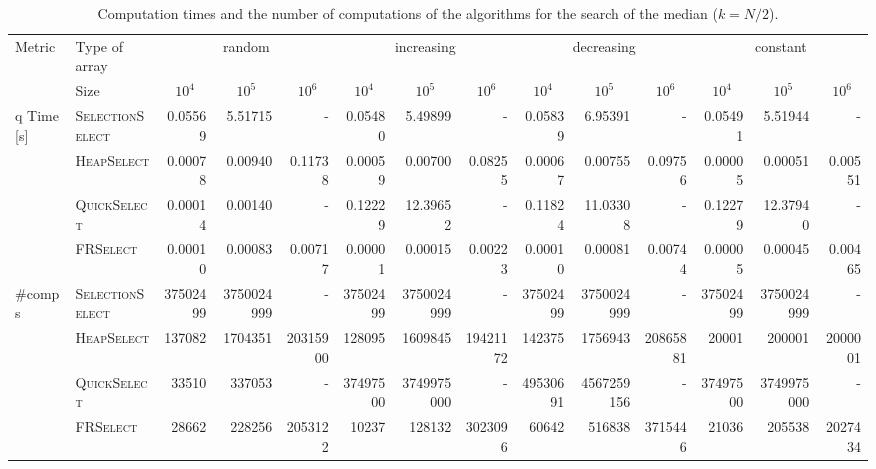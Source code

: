 \documentclass[acmconf,nonacm=true]{acmart}
\begin{document}
\begin{table}[h!]
    \centering
    \scriptsize
    \caption{Computation times and the number of computations of the algorithms for the search of the median ($k=N/2$).}
    \label{table:k-0.5N}
    \begin{tabular}{llrrrrrrrrrrrr}
        \toprule
        {Metric} & {Type of array} & \multicolumn{3}{c}{{random}} & \multicolumn{3}{c}{{increasing}} & \multicolumn{3}{c}{{decreasing}} & \multicolumn{3}{c}{{constant}} \\
        \cmidrule(r){3-5} \cmidrule(lr){6-8} \cmidrule(lr){9-11} \cmidrule(l){12-14}
        & {Size} & \multicolumn{1}{c}{$10^4$} & \multicolumn{1}{c}{$10^5$} & \multicolumn{1}{c}{$10^6$} & \multicolumn{1}{c}{$10^4$} & \multicolumn{1}{c}{$10^5$} & \multicolumn{1}{c}{$10^6$} & \multicolumn{1}{c}{$10^4$} & \multicolumn{1}{c}{$10^5$} & \multicolumn{1}{c}{$10^6$} & \multicolumn{1}{c}{$10^4$} & \multicolumn{1}{c}{$10^5$} & \multicolumn{1}{c}{$10^6$} \\
        \midrule 
q        Time [s] & \textsc{SelectionSelect} & 0.05569 & 5.51715 & - & 0.05480 & 5.49899 & - & 0.05839 & 6.95391 & - & 0.05491 & 5.51944 & - \\
        & \textsc{HeapSelect} & 0.00078 & 0.00940 & 0.11738 & 0.00059 & 0.00700 & 0.08255 & 0.00067 & 0.00755 & 0.09756 & 0.00005 & 0.00051 & 0.00551 \\
        & \textsc{QuickSelect} & 0.00014 & 0.00140 & - & 0.12229 & 12.39652 & - & 0.11824 & 11.03308 & - & 0.12279 & 12.37940 & - \\
        & \textsc{FRSelect} & 0.00010 & 0.00083 & 0.00717 & 0.00001 & 0.00015 & 0.00223 & 0.00010 & 0.00081 & 0.00744 & 0.00005 & 0.00045 & 0.00465 \\
        \midrule 
        \#comps & \textsc{SelectionSelect} & 37502499 & 3750024999 & - & 37502499 & 3750024999 & - & 37502499 & 3750024999 & - & 37502499 & 3750024999 & - \\
        & \textsc{HeapSelect} & 137082 & 1704351 & 20315900 & 128095 & 1609845 & 19421172 & 142375 & 1756943 & 20865881 & 20001 & 200001 & 2000001 \\
        & \textsc{QuickSelect} & 33510 & 337053 & - & 37497500 & 3749975000 & - & 49530691 & 4567259156 & - & 37497500 & 3749975000 & - \\
        & \textsc{FRSelect} & 28662 & 228256 & 2053122 & 10237 & 128132 & 3023096 & 60642 & 516838 & 3715446 & 21036 & 205538 & 2027434 \\
        \bottomrule
    \end{tabular}
\end{table}
\end{document}
